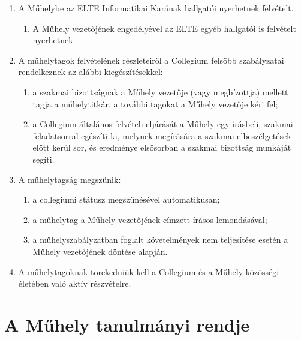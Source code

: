 \documentclass{../styles/rulebook}
\begin{document}
\begin{enumerate}
	\item A Műhelybe az ELTE Informatikai Karának hallgatói nyerhetnek felvételt.
	\begin{enumerate}
		\item A Műhely vezetőjének engedélyével az ELTE egyéb hallgatói is felvételt nyerhetnek.
	\end{enumerate}
	\item A műhelytagok felvételének részleteiről a Collegium felsőbb szabályzatai rendelkeznek az alábbi kiegészítésekkel:
	\begin{enumerate}
		\item a szakmai bizottságnak a Műhely vezetője (vagy megbízottja) mellett tagja a műhelytitkár, a további tagokat a Műhely vezetője kéri fel;
		\item a Collegium általános felvételi eljárását a Műhely egy írásbeli, szakmai feladatsorral egészíti ki, melynek megírására a szakmai elbeszélgetések előtt kerül sor, és eredménye elsősorban a szakmai bizottság munkáját segíti.
	\end{enumerate}
	\item A műhelytagság megszűnik:
	\begin{enumerate}
		\item a collegiumi státusz megszűnésével automatikusan;
		\item a műhelytag a Műhely vezetőjének címzett írásos lemondásával;
		\item a műhelyszabályzatban foglalt követelmények nem teljesítése esetén a Műhely vezetőjének döntése alapján.
	\end{enumerate}
	\item A műhelytagoknak törekedniük kell a Collegium és a Műhely közösségi életében való aktív részvételre.
\end{enumerate}

\section{A Műhely tanulmányi rendje}
\end{document}
